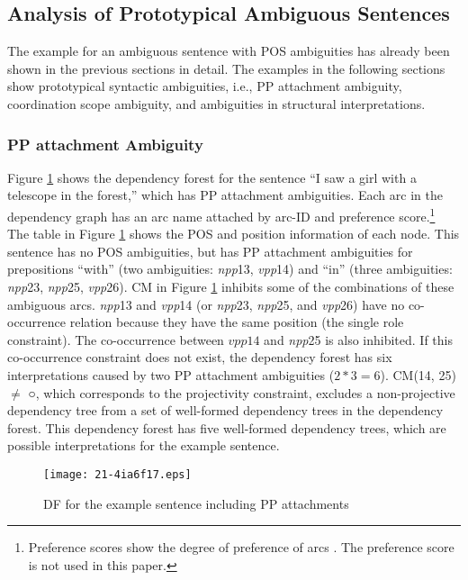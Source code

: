 \documentclass[english]{jnlp_1.4_rep}
\theoremstyle{break}
\theoremstyle{plain}
\theoremstyle{plain}
\begin{document}
\subsection{Analysis of Prototypical Ambiguous Sentences}

The example for an ambiguous sentence with POS ambiguities has
already been shown in the previous sections in detail. The examples in
the following sections show prototypical syntactic ambiguities, i.e.,
PP attachment ambiguity, coordination scope ambiguity, and ambiguities
in structural interpretations.


\subsubsection{PP attachment Ambiguity}
\label{sec:PP-attachment}

Figure \ref{fig:DFForISawSec4} shows the dependency forest for the
sentence ``I saw a girl with a telescope in the forest,'' which has PP
attachment ambiguities. Each arc in the dependency graph has an arc
name attached by arc-ID and preference score.\footnote{Preference
  scores show the degree of preference of arcs
  \cite{Hirakawa06b_e,Hirakawa07}. The preference score is not used in
  this paper.} The table in Figure \ref{fig:DFForISawSec4} shows the
POS and position information of each node. This sentence has no POS
ambiguities, but has PP attachment ambiguities for prepositions
``with'' (two ambiguities: \textit{npp}13, \textit{vpp}14) and ``in'' (three
ambiguities: \textit{npp}23, \textit{npp}25, \textit{vpp}26). CM in
Figure \ref{fig:DFForISawSec4} inhibits some of the combinations of these
ambiguous arcs. \textit{npp}13 and \textit{vpp}14 (or \textit{npp}23, \textit{npp}25, and \textit{vpp}26)
have no co-occurrence relation because they have the same position
(the single role constraint). The co-occurrence between $vpp14$ and
\textit{npp}25 is also inhibited. If this co-occurrence constraint does not
exist, the dependency forest has six interpretations caused by two PP
attachment ambiguities ($2*3=6$). CM(14, 25)${\neq}$ ○, which
corresponds to the projectivity constraint, excludes a non-projective
dependency tree from a set of well-formed dependency trees in the
dependency forest. This dependency forest has five well-formed
dependency trees, which are possible interpretations for the example
sentence.

\begin{figure}[b]
\begin{center}
\texttt{[image: 21-4ia6f17.eps]}
\end{center}
\caption{DF for the example sentence including PP attachments}
\label{fig:DFForISawSec4}
\end{figure}
\end{document}
